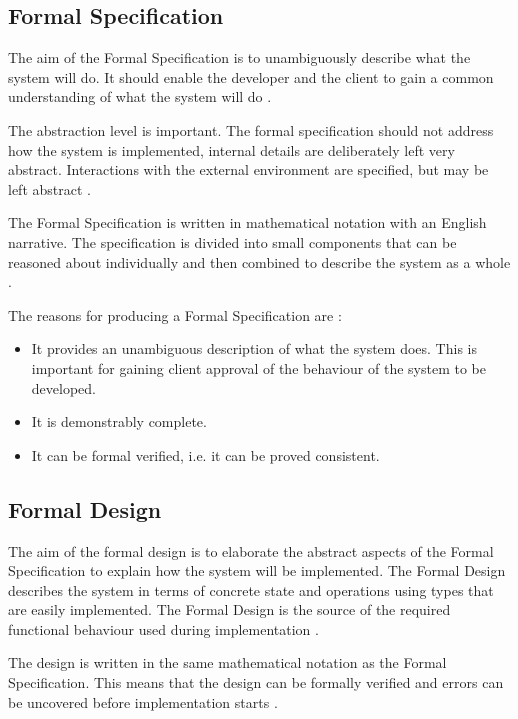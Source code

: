 \subsection{Formal Specification}

The aim of the Formal Specification is to unambiguously describe what the system
will do. It should enable the developer and the client to gain a common
understanding of what the system will do \parencite{Tokeneer}.

The abstraction level is important. The formal specification should not address 
how the system is implemented, internal details are deliberately left very abstract. 
Interactions with the external environment are specified, but may be left abstract \parencite{Tokeneer}.

The Formal Specification is written in mathematical notation with an English 
narrative. The specification is divided into small components that can be reasoned
about individually and then combined to describe the system as a whole \parencite{Tokeneer}.

The reasons for producing a Formal Specification are \parencite{Tokeneer}:
\begin{itemize}
	\item It provides an unambiguous description of what the system does. This is
		important for gaining client approval of the behaviour of the system to be
		developed.
	\item It is demonstrably complete.
	\item It can be formal verified, i.e. it can be proved consistent.
\end{itemize}

\subsection{Formal Design}

The aim of the formal design is to elaborate the abstract aspects of the Formal 
Specification to explain how the system will be implemented. The Formal Design 
describes the system in terms of concrete state and operations using types that
are easily implemented. The Formal Design is the source of the required functional
behaviour used during implementation  \parencite{Tokeneer}.

The design is written in the same mathematical notation as the Formal Specification.
This means that the design can be formally verified and errors can be uncovered
before implementation starts \parencite{Tokeneer}.

